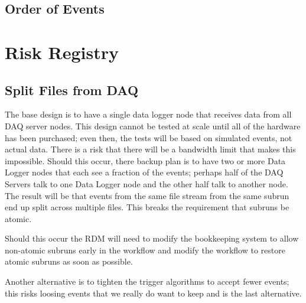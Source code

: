 \section{Order of Events}

\chapter{Risk Registry}
\label{app:RisKRegistry}

\section{Split Files from DAQ}
\label{app:Risk:SplitFiles}

The base design is to have a single data logger node that receives data from all DAQ server nodes.
This design cannot be tested at scale until all of the hardware has been purchased;
even then, the tests will be based on simulated events, not actual data.
There is a risk that there will be a bandwidth limit that makes this impossible.
Should this occur, there backup plan is to have two or more Data Logger nodes
that each see a fraction of the events;
perhaps half of the DAQ Servers talk to one Data Logger node and the other half talk to another node.
The result will be that events from the same file stream from the same subrun end up split across multiple files.
This breaks the requirement that subruns be atomic.

Should this occur the RDM will need to modify the bookkeeping system to allow non-atomic subruns early
in the workflow and modify the workflow to restore atomic subruns as soon as possible.

Another alternative is to tighten the trigger algorithms to accept fewer events;
this risks loosing events that we really do want to keep and is the last alternative.

\clearpage
{}
{}
\printbibliography


